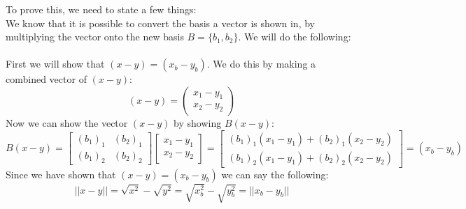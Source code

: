 To prove this, we need to state a few things:\\
We know that it is possible to convert the basis a vector is shown in, by multiplying the vector onto the new basis $B =\{b_1,b_2\}$. We will do the following:\\\\
First we will show that $(x-y) = (x_b-y_b)$. We do this by making a combined vector of $(x-y)$:
$$
(x-y) = 
\begin{pmatrix}
x_1-y_1\\
x_2-y_2
\end{pmatrix}
$$
Now we can show the vector $(x-y)$ by showing $B(x-y)$:\\
$$
B(x-y) =
\begin{bmatrix}
(b_1)_1 & (b_2)_1\\
(b_1)_2 & (b_2)_2
\end{bmatrix}
\begin{bmatrix}
x_1-y_1\\
x_2-y_2
\end{bmatrix}
=
\begin{bmatrix}
(b_1)_1(x_1-y_1) + (b_2)_1(x_2-y_2)\\
(b_1)_2(x_1-y_1) + (b_2)_2(x_2-y_2)
\end{bmatrix}
= (x_b-y_b)
$$
Since we have shown that $(x-y)=(x_b-y_b)$ we can say the following:
$$
||x-y|| = \sqrt{x^2}-\sqrt{y^2} = \sqrt{x^2_b}-\sqrt{y^2_b} = ||x_b-y_b||
$$